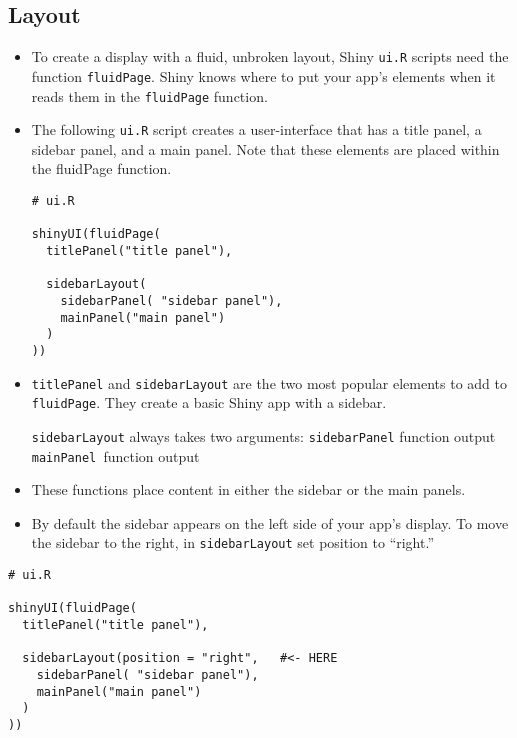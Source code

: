\documentclass[a4paper,12pt]{article}
\begin{document}
\subsection*{Layout}

\begin{itemize}
\item To create a display with a fluid, unbroken layout, Shiny \texttt{ui.R} scripts need the function \texttt{fluidPage}. Shiny knows where to put your app’s elements when it reads them in the \texttt{fluidPage} function.

\item The following \texttt{ui.R} script creates a user-interface that has a title panel, a sidebar panel, and a main panel. Note that these elements are placed within the fluidPage function.

\begin{framed}
\begin{verbatim}
# ui.R

shinyUI(fluidPage(
  titlePanel("title panel"),

  sidebarLayout(
    sidebarPanel( "sidebar panel"),
    mainPanel("main panel")
  )
))
\end{verbatim}
\end{framed}


\item \texttt{titlePanel} and \texttt{sidebarLayout} are the two most popular elements to add to \texttt{fluidPage}. They create a basic Shiny app with a sidebar.

\subitem \texttt{sidebarLayout} always takes two arguments:
\subitem \texttt{sidebarPanel} function output
\subitem \texttt{mainPanel }function output

\item These functions place content in either the sidebar or the main panels.
\item 
By default the sidebar appears on the left side of your app’s display. To move the sidebar to the right, in \texttt{sidebarLayout} set position to “right.”
\end{itemize}
\begin{framed}
\begin{verbatim}
# ui.R

shinyUI(fluidPage(
  titlePanel("title panel"),

  sidebarLayout(position = "right",   #<- HERE
    sidebarPanel( "sidebar panel"),
    mainPanel("main panel")
  )
))
\end{verbatim}
\end{framed}
\end{document}
